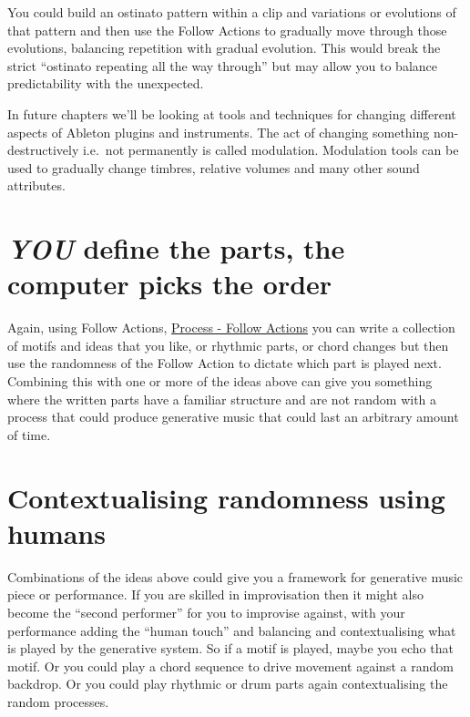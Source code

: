 \documentclass[
  12pt,
  letterpaper,
  oneside,
  open=any]{scrbook}
\begin{document}
You could build an ostinato pattern within a clip and variations or
evolutions of that pattern and then use the Follow Actions to gradually
move through those evolutions, balancing repetition with gradual
evolution. This would break the strict ``ostinato repeating all the way
through'' but may allow you to balance predictability with the
unexpected.

In future chapters we'll be looking at tools and techniques for changing
different aspects of Ableton plugins and instruments. The act of
changing something non-destructively i.e.~not permanently is called
modulation. Modulation tools can be used to gradually change timbres,
relative volumes and many other sound attributes.

\section{\texorpdfstring{\textbf{\emph{YOU}} define the parts, the
computer picks the
order}{YOU define the parts, the computer picks the order}}\label{you-define-the-parts-the-computer-picks-the-order}

Again, using Follow Actions,
\hyperref[Chapter-003-Process-Follow_Actions]{Process - Follow Actions}
you can write a collection of motifs and ideas that you like, or
rhythmic parts, or chord changes but then use the randomness of the
Follow Action to dictate which part is played next. Combining this with
one or more of the ideas above can give you something where the written
parts have a familiar structure and are not random with a process that
could produce generative music that could last an arbitrary amount of
time.

\section{Contextualising randomness using
humans}\label{contextualising-randomness-using-humans}

Combinations of the ideas above could give you a framework for
generative music piece or performance. If you are skilled in
improvisation then it might also become the ``second performer'' for you
to improvise against, with your performance adding the ``human touch''
and balancing and contextualising what is played by the generative
system. So if a motif is played, maybe you echo that motif. Or you could
play a chord sequence to drive movement against a random backdrop. Or
you could play rhythmic or drum parts again contextualising the random
processes.
\end{document}
